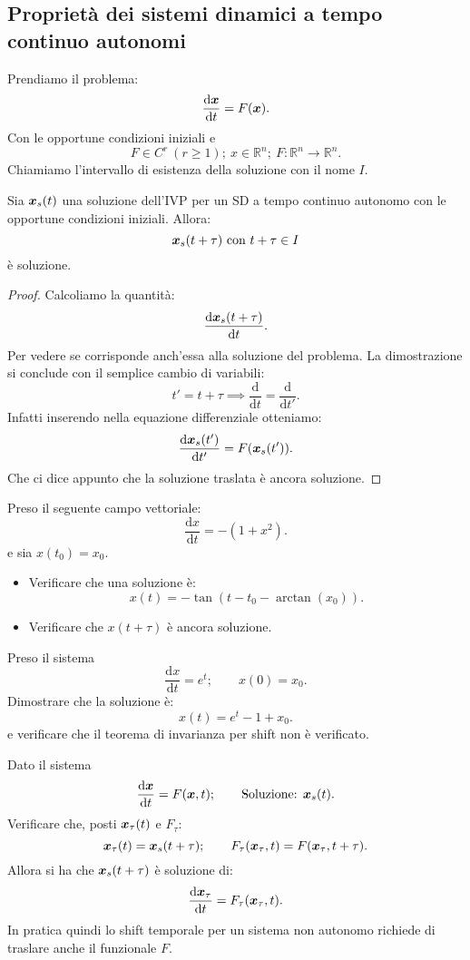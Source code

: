 \subsection{Proprietà dei sistemi dinamici a tempo continuo autonomi}%
\label{sub:Proprietà dei sistemi dinamici a tempo continuo autonomi}
Prendiamo il problema:
\[
	\frac{\text{d} \boldsymbol{x}}{\text{d} t} = F(\boldsymbol{x})
.\] 
Con le opportune condizioni iniziali e
\[
    F \in C^r \ (r\ge 1); \ x \in \mathbb{R}^n; \ F:\mathbb{R}^n\to \mathbb{R}^n
.\] 
Chiamiamo l'intervallo di esistenza della soluzione con il nome $I$.
\begin{thm}
    Sia $\boldsymbol{x}_s(t)$ una soluzione dell'IVP per un SD a tempo continuo autonomo con le opportune condizioni iniziali. Allora: 
    \[
	\boldsymbol{x}_s(t+\tau) \text{ con } t + \tau  \in I 
    \] 
    è soluzione.
\end{thm}
\noindent
\begin{proof}
    Calcoliamo la quantità:
    \[
	\frac{\text{d} \boldsymbol{x}_s(t+\tau)}{\text{d} t} 
    .\] 
    Per vedere se corrisponde anch'essa alla soluzione del problema. La dimostrazione si conclude con il semplice cambio di variabili:
    \[
        t' = t + \tau  \implies  \frac{\text{d} }{\text{d} t} = \frac{\text{d} }{\text{d} t'} 
    .\] 
    Infatti inserendo nella equazione differenziale otteniamo:
    \[
	\frac{\text{d} \boldsymbol{x}_s(t')}{\text{d} t'} = F(\boldsymbol{x}_s(t'))
    .\] 
    Che ci dice appunto che la soluzione traslata è ancora soluzione.
\end{proof}
\begin{ex}
    Preso il seguente campo vettoriale:
    \[
	\frac{\text{d} x}{\text{d} t} = - (1+x^2)
    .\] 
    e sia $x(t_0)=x_0$.
    \begin{itemize}
        \item Verificare che una soluzione è:
	    \[
		x(t)=- \tan(t-t_0-\arctan (x_0))
	    .\] 
	\item Verificare che $x(t+\tau)$ è ancora soluzione.
    \end{itemize}
\end{ex}
\noindent
\begin{ex}
    Preso il sistema
    \[
	\frac{\text{d} x}{\text{d} t} = e^t; \qquad  x(0)=x_0
    .\] 
    Dimostrare che la soluzione è:
    \[
	x(t)=e^t-1+x_0
    .\] 
    e verificare che il teorema di invarianza per shift non è verificato.
\end{ex}
\noindent
\begin{ex}
   Dato il sistema 
   \[
       \frac{\text{d} \boldsymbol{x}}{\text{d} t} = F(\boldsymbol{x}, t); \qquad \text{Soluzione: }\boldsymbol{x}_s(t)
   .\] 
   Verificare che, posti $\boldsymbol{x}_{\tau}(t)$ e $F_{\tau}$:
   \[
       \boldsymbol{x}_{\tau}(t)=\boldsymbol{x}_s(t+\tau); \qquad F_{\tau}(\boldsymbol{x}_{\tau}, t) = F(\boldsymbol{x}_\tau, t+\tau)
   .\] 
   Allora si ha che $\boldsymbol{x}_s(t+\tau)$ è soluzione di:
   \[
       \frac{\text{d} \boldsymbol{x}_\tau}{\text{d} t} = F_\tau (\boldsymbol{x}_\tau, t)
   .\] 
   In pratica quindi lo shift temporale per un sistema non autonomo richiede di traslare anche il funzionale $F$. 
\end{ex}
